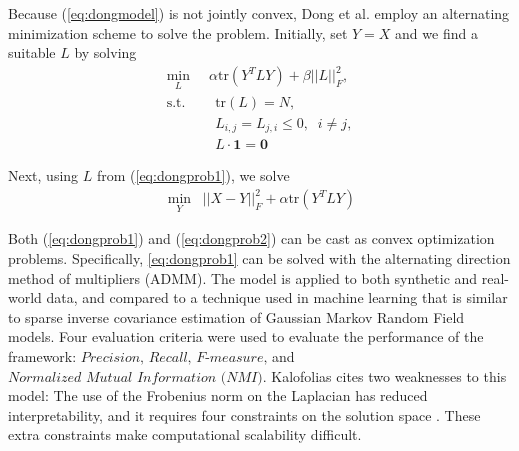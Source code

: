\documentclass[journal]{IEEEtran}
\theoremstyle{definition}
\theoremstyle{remark}
\begin{document}
Because (\ref{eq:dongmodel}) is not jointly convex, Dong et al. employ an alternating minimization scheme to solve the problem. Initially, set $Y = X$ and we find a suitable $L$ by solving 
\begin{equation}
	\label{eq:dongprob1}
	\begin{aligned}
		\min_L       & \phantom{..} \alpha \text{tr}(Y^TLY) + \beta ||L||_F^2, \\
		\textrm{s.t.}& \quad \text{tr}(L) = N,\\
					 & \quad L_{i,j} = L_{j,i} \leq 0, \phantom{..} i \neq j, \\
					 & \quad L\cdot \textbf{1} = \textbf{0}
	\end{aligned}
\end{equation}

Next, using $L$ from (\ref{eq:dongprob1}), we solve 
\begin{equation}
	\label{eq:dongprob2}
	\begin{aligned}
		\min_Y \phantom{..} ||X-Y||_F^2 + \alpha \text{tr}(Y^TLY)
	\end{aligned}
\end{equation}

Both (\ref{eq:dongprob1}) and (\ref{eq:dongprob2}) can be cast as convex optimization problems. Specifically, \ref{eq:dongprob1} can be solved with the alternating direction method of multipliers (ADMM). The model is applied to both synthetic and real-world data, and compared to a technique used in machine learning that is similar to sparse inverse covariance estimation of Gaussian Markov Random Field models. Four evaluation criteria were used to evaluate the performance of the framework: $\textit{Precision, Recall, F-measure,}$ and $\textit{Normalized Mutual Information (NMI)}$. Kalofolias cites two weaknesses to this model: The use of the Frobenius norm on the Laplacian has reduced interpretability, and it requires four constraints on the solution space \cite{kalofolias2016learn}. These extra constraints make computational scalability difficult.
\end{document}
